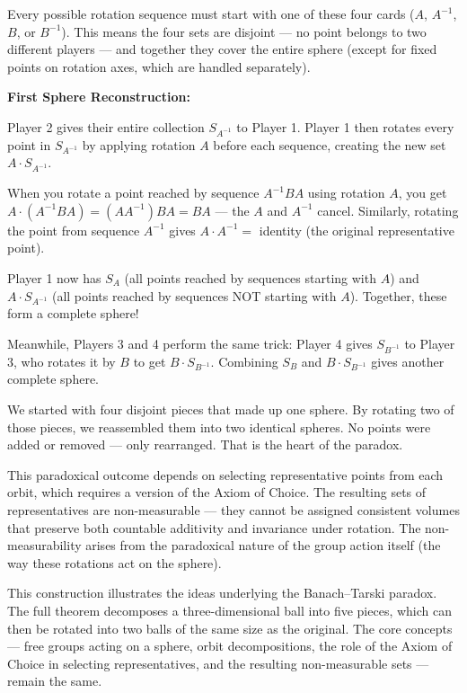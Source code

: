 Every possible rotation sequence must start with one of these four cards ($A$, $A^{-1}$, $B$, or $B^{-1}$). This means the four sets are disjoint — no point belongs to two different players — and together they cover the entire sphere (except for fixed points on rotation axes, which are handled separately).

\textbf{First Sphere Reconstruction:}

Player 2 gives their entire collection $S_{A^{-1}}$ to Player 1. Player 1 then rotates every point in $S_{A^{-1}}$ by applying rotation $A$ before each sequence, creating the new set $A \cdot S_{A^{-1}}$.

When you rotate a point reached by sequence $A^{-1}BA$ using rotation $A$, you get $A \cdot (A^{-1}BA) = (AA^{-1})BA = BA$ — the $A$ and $A^{-1}$ cancel. Similarly, rotating the point from sequence $A^{-1}$ gives $A \cdot A^{-1} = $ identity (the original representative point).

Player 1 now has $S_A$ (all points reached by sequences starting with $A$) and $A \cdot S_{A^{-1}}$ (all points reached by sequences NOT starting with $A$). Together, these form a complete sphere!

Meanwhile, Players 3 and 4 perform the same trick: Player 4 gives $S_{B^{-1}}$ to Player 3, who rotates it by $B$ to get $B \cdot S_{B^{-1}}$. Combining $S_B$ and $B \cdot S_{B^{-1}}$ gives another complete sphere.

We started with four disjoint pieces that made up one sphere. By rotating two of those pieces, we reassembled them into two identical spheres. No points were added or removed — only rearranged. That is the heart of the paradox.

This paradoxical outcome depends on selecting representative points from each orbit, which requires a version of the Axiom of Choice. The resulting sets of representatives are non-measurable — they cannot be assigned consistent volumes that preserve both countable additivity and invariance under rotation. The non-measurability arises from the paradoxical nature of the group action itself (the way these rotations act on the sphere).

This construction illustrates the ideas underlying the Banach–Tarski paradox. The full theorem decomposes a three-dimensional ball into five pieces, which can then be rotated into two balls of the same size as the original. The core concepts — free groups acting on a sphere, orbit decompositions, the role of the Axiom of Choice in selecting representatives, and the resulting non-measurable sets — remain the same.

